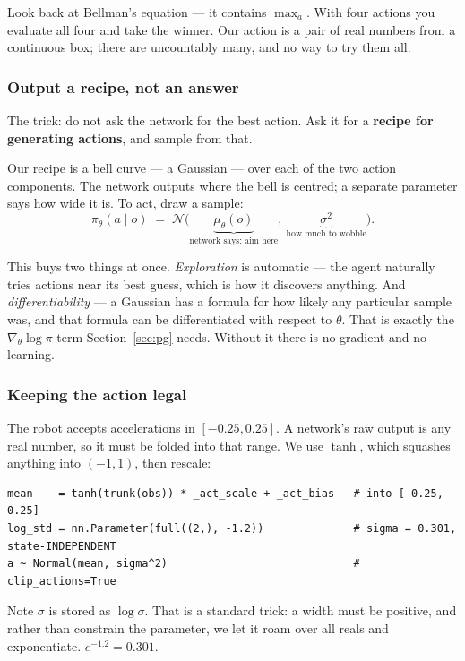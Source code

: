 \documentclass[11pt,a4paper]{article}
\begin{document}
Look back at Bellman's equation --- it contains $\max_a$. With four actions you evaluate all
four and take the winner. Our action is a pair of real numbers from a continuous box; there
are uncountably many, and no way to try them all.

\subsubsection*{Output a recipe, not an answer}

The trick: do not ask the network for the best action. Ask it for a \textbf{recipe for
generating actions}, and sample from that.

Our recipe is a bell curve --- a Gaussian --- over each of the two action components. The
network outputs where the bell is centred; a separate parameter says how wide it is. To act,
draw a sample:
\[
  \pi_\theta(a \mid o) \;=\; \mathcal N\!\big(\underbrace{\mu_\theta(o)}_{\text{network says: aim here}},\ \underbrace{\sigma^2}_{\text{how much to wobble}}\big).
\]

This buys two things at once. \emph{Exploration} is automatic --- the agent naturally tries
actions near its best guess, which is how it discovers anything. And \emph{differentiability}
--- a Gaussian has a formula for how likely any particular sample was, and that formula can
be differentiated with respect to $\theta$. That is exactly the $\nabla_\theta \log\pi$ term
Section~\ref{sec:pg} needs. Without it there is no gradient and no learning.

\subsubsection*{Keeping the action legal}

The robot accepts accelerations in $[-0.25, 0.25]$. A network's raw output is any real
number, so it must be folded into that range. We use $\tanh$, which squashes anything into
$(-1,1)$, then rescale:

\begin{lstlisting}
mean    = tanh(trunk(obs)) * _act_scale + _act_bias   # into [-0.25, 0.25]
log_std = nn.Parameter(full((2,), -1.2))              # sigma = 0.301, state-INDEPENDENT
a ~ Normal(mean, sigma^2)                             # clip_actions=True
\end{lstlisting}

Note $\sigma$ is stored as $\log\sigma$. That is a standard trick: a width must be positive,
and rather than constrain the parameter, we let it roam over all reals and exponentiate.
$e^{-1.2} = 0.301$.
\end{document}
